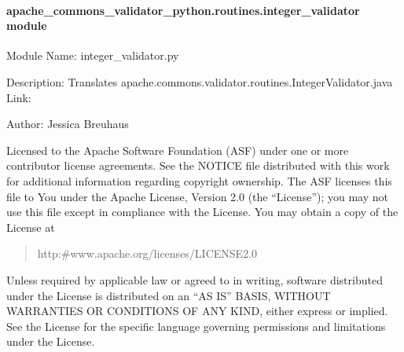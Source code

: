 \documentclass[letterpaper,10pt,english]{sphinxmanual}
\begin{document}
\paragraph{apache\_commons\_validator\_python.routines.integer\_validator module}
\label{\detokenize{apache_commons_validator_python.routines:module-apache_commons_validator_python.routines.integer_validator}}\label{\detokenize{apache_commons_validator_python.routines:apache-commons-validator-python-routines-integer-validator-module}}
\sphinxAtStartPar
Module Name: integer\_validator.py

\sphinxAtStartPar
Description: Translates apache.commons.validator.routines.IntegerValidator.java
Link: 

\sphinxAtStartPar
Author: Jessica Breuhaus
\begin{description}
\sphinxAtStartPar
Licensed to the Apache Software Foundation (ASF) under one or more
contributor license agreements.  See the NOTICE file distributed with
this work for additional information regarding copyright ownership.
The ASF licenses this file to You under the Apache License, Version 2.0
(the “License”); you may not use this file except in compliance with
the License.  You may obtain a copy of the License at
\begin{quote}

\sphinxAtStartPar
http:\#www.apache.org/licenses/LICENSE\sphinxhyphen{}2.0
\end{quote}

\sphinxAtStartPar
Unless required by applicable law or agreed to in writing, software
distributed under the License is distributed on an “AS IS” BASIS,
WITHOUT WARRANTIES OR CONDITIONS OF ANY KIND, either express or implied.
See the License for the specific language governing permissions and
limitations under the License.

\end{description}
\end{document}
